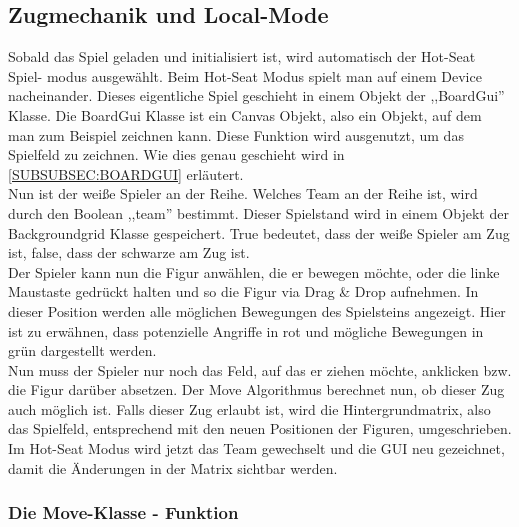 \documentclass[12pt,a4paper]{article}
\begin{document}
\subsection{Zugmechanik und Local-Mode}
\label{SUBSEC:LOCAL_MODE}

Sobald das Spiel geladen und initialisiert ist, wird automatisch der Hot-Seat Spiel- modus ausgewählt. Beim Hot-Seat Modus spielt man auf einem Device nacheinander. Dieses eigentliche Spiel geschieht in einem Objekt der ,,BoardGui'' Klasse. Die BoardGui Klasse ist ein Canvas Objekt, also ein Objekt, auf dem man zum Beispiel zeichnen kann. Diese Funktion wird ausgenutzt, um das Spielfeld zu zeichnen. Wie dies genau geschieht wird in \ref{SUBSUBSEC:BOARDGUI}
erläutert.  \\
Nun ist der weiße Spieler an der Reihe. Welches Team an der Reihe ist, wird durch den Boolean ,,team'' bestimmt. Dieser Spielstand wird in einem Objekt der Backgroundgrid Klasse gespeichert. True bedeutet, dass der weiße Spieler am Zug ist, false, dass der schwarze am Zug ist. \\
Der Spieler kann nun die Figur anwählen, die er bewegen möchte, oder die linke Maustaste gedrückt halten und so die Figur via Drag \& Drop aufnehmen. In dieser Position werden alle möglichen Bewegungen des Spielsteins angezeigt. Hier ist zu erwähnen, dass potenzielle Angriffe in rot und mögliche Bewegungen in grün dargestellt werden.\\
Nun muss der Spieler nur noch das Feld, auf das er ziehen möchte, anklicken bzw. die Figur darüber absetzen. Der Move Algorithmus berechnet nun, ob dieser Zug auch möglich ist. Falls dieser Zug erlaubt ist, wird die Hintergrundmatrix, also das Spielfeld, entsprechend mit den neuen Positionen der Figuren, umgeschrieben. \\
Im Hot-Seat Modus wird jetzt das Team gewechselt und die GUI neu gezeichnet, damit die Änderungen in der Matrix sichtbar werden. 

\subsubsection{Die Move-Klasse - Funktion}
\label{SUBSUBSEC:MOVE}
\end{document}
